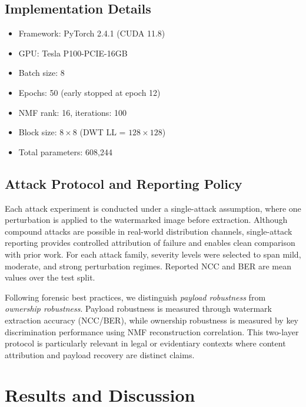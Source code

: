 \documentclass[journal]{IEEEtran}
\begin{document}
\subsection{Implementation Details}

\begin{itemize}
  \item Framework: PyTorch 2.4.1 (CUDA 11.8)
  \item GPU: Tesla P100-PCIE-16GB
  \item Batch size: 8
  \item Epochs: 50 (early stopped at epoch 12)
  \item NMF rank: 16, iterations: 100
  \item Block size: $8 \times 8$ (DWT LL = $128 \times 128$)
  \item Total parameters: 608,244
\end{itemize}

\subsection{Attack Protocol and Reporting Policy}

Each attack experiment is conducted under a single-attack assumption, where
one perturbation is applied to the watermarked image before extraction.
Although compound attacks are possible in real-world distribution channels,
single-attack reporting provides controlled attribution of failure and enables
clean comparison with prior work. For each attack family, severity levels were
selected to span mild, moderate, and strong perturbation regimes. Reported NCC
and BER are mean values over the test split.

Following forensic best practices, we distinguish \emph{payload robustness}
from \emph{ownership robustness}. Payload robustness is measured through
watermark extraction accuracy (NCC/BER), while ownership robustness is measured
by key discrimination performance using NMF reconstruction correlation. This
two-layer protocol is particularly relevant in legal or evidentiary contexts
where content attribution and payload recovery are distinct claims.

\section{Results and Discussion}
\end{document}

